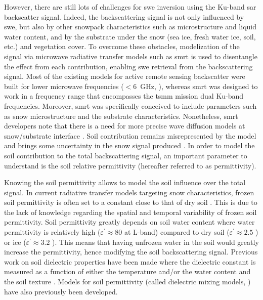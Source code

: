 However, there are still lots of challenges for \ac{swe} inversion using the Ku-band \ac{sar} backscatter signal.
Indeed, the backscattering signal is not only influenced by \ac{swe}, but also by other snowpack characteristics such as microstructure and liquid water content, and by the substrate under the snow (sea ice, fresh water ice, soil, etc.) and vegetation cover.
To overcome these obstacles, modelization of the signal via microwave radiative transfer models such as \ac{smrt} \parencite{Picard2018} is used to disentangle the effect from each contribution, enabling \ac{swe} retrieval from the backscattering signal.
Most of the existing models for active remote sensing backscatter were built for lower microwave frequencies (\(<\)\qty{6}{\giga\hertz}, \parencite{Longepe2009}), whereas \ac{smrt} was designed to work in a frequency range that encompasses the \ac{tsmm} mission dual Ku-band frequencies.
Moreover, \ac{smrt} was specifically conceived to include parameters such as snow microstructure and the substrate characteristics.
Nonetheless, \ac{smrt} developers note that there is a need for more precise wave diffusion models at snow/substrate interface \parencite{Picard2018}.
Soil contribution remains misrepresented by the model and brings some uncertainty in the snow signal produced \parencite{King2018}.
In order to model the soil contribution to the total backscattering signal, an important parameter to understand is the soil relative permittivity (hereafter referred to as permittivity).

Knowing the soil permittivity allows to model the soil influence over the total signal.
In current radiative transfer models targeting snow characteristics, frozen soil permittivity is often set to a constant close to that of dry soil \parencite{Hallikainen1985,Kerr2012}.
This is due to the lack of knowledge regarding the spatial and temporal variability of frozen soil permittivity.
Soil permittivity greatly depends on soil water content \parencite{Topp1980} where water permittivity is relatively high (\(\varepsilon^\prime \approx 80\) at L-band) compared to dry soil (\(\varepsilon^\prime \approx 2.5\) \parencite{Matzler1998}) or ice (\(\varepsilon^\prime \approx 3.2\) \parencite{Matzler1987}).
This means that having unfrozen water in the soil would greatly increase the permittivity, hence modifying the soil backscattering signal.
Previous work on soil dielectric properties have been made where the dielectric constant is measured as a function of either the temperature and/or the water content and the soil texture \parencite{Cihlar1974,Hoekstra1974,Bobrov2015,Kabir2020}.
Models for soil permittivity (called dielectric mixing models, \parencite{Dobson1985,Hallikainen1985,Mironov2009,Zhang2010}) have also previously been developed.%

